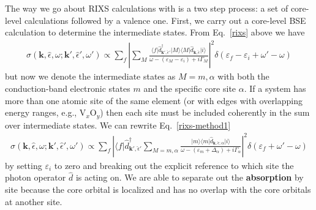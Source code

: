 \documentclass[11pt]{report}
\begin{document}
The way we go about RIXS calculations with  is a two step process: a set of core-level calculations followed by a valence one. 
First, we carry out a core-level BSE calculation to determine the intermediate states.
From Eq.~\ref{rixs} above we have
\begin{align}
\sigma( \mathbf{k}, \hat{\epsilon}, \omega; \mathbf{k}', \hat{\epsilon}', \omega' )
\propto \sum_f \left| \sum_M \frac{ \langle f \vert \hat{d}^\dagger_{\mathbf{k}', \hat{\epsilon}'} \vert M \rangle \langle M \vert \hat{d}_{\mathbf{k}, \hat{\epsilon}} \vert i \rangle}{\omega - (\varepsilon_M - \varepsilon_i) + i\Gamma_M} \right|^2 \delta( \varepsilon_f - \varepsilon_i + \omega'-\omega)
\label{rixs-method1}
\end{align}
but now we denote the intermediate states as $M=m,\alpha$ with both the conduction-band electronic states $m$ and the specific core site $\alpha$.
If a system has more than one atomic site of the same element (or with edges with overlapping energy ranges, e.g., V$_x$O$_y$) then each site must be included coherently in the sum over intermediate states. 
We can rewrite Eq.~\ref{rixs-method1}
\begin{align}
\sigma( \mathbf{k}, \hat{\epsilon}, \omega; \mathbf{k}', \hat{\epsilon}', \omega' )
\propto \sum_f \left|  \langle f \vert \hat{d}^\dagger_{\mathbf{k}', \hat{\epsilon}'} \sum_{M=m,\alpha} \frac{ \vert m \rangle \langle m \vert \hat{d}_{\mathbf{k}, \hat{\epsilon};\alpha} \vert i \rangle}{\omega - (\varepsilon_m +\Delta_\alpha) + i\Gamma_{\alpha}} \right|^2 \delta( \varepsilon_f  + \omega'-\omega)
\label{rixs-method2}
\end{align}
by setting $\varepsilon_i$ to zero and breaking out the explicit reference to which site the photon operator $\hat{d}$ is acting on. 
We are able to separate out the {\bf absorption} by site because the core orbital is localized and has no overlap with the core orbitals at another site. 
\end{document}
